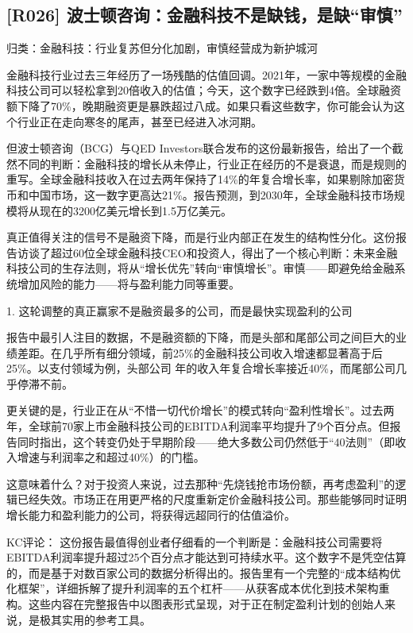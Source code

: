 \documentclass[11pt]{ctexart}
\begin{document}
\subsection{[R026] 波士顿咨询：金融科技不是缺钱，是缺“审慎”}
{\small\color{refgray}归类：金融科技：行业复苏但分化加剧，审慎经营成为新护城河}

金融科技行业过去三年经历了一场残酷的估值回调。2021年，一家中等规模的金融科技公司可以轻松拿到20倍收入的估值；今天，这个数字已经跌到4倍。全球融资额下降了70\%，晚期融资更是暴跌超过八成。如果只看这些数字，你可能会认为这个行业正在走向寒冬的尾声，甚至已经进入冰河期。

但波士顿咨询（BCG）与QED Investors联合发布的这份最新报告，给出了一个截然不同的判断：金融科技的增长从未停止，行业正在经历的不是衰退，而是规则的重写。全球金融科技收入在过去两年保持了14\%的年复合增长率，如果剔除加密货币和中国市场，这一数字更高达21\%。报告预测，到2030年，全球金融科技市场规模将从现在的3200亿美元增长到1.5万亿美元。

真正值得关注的信号不是融资下降，而是行业内部正在发生的结构性分化。这份报告访谈了超过60位全球金融科技CEO和投资人，得出了一个核心判断：未来金融科技公司的生存法则，将从“增长优先”转向“审慎增长”。审慎——即避免给金融系统增加风险的能力——将与盈利能力同等重要。

1. 这轮调整的真正赢家不是融资最多的公司，而是最快实现盈利的公司

报告中最引人注目的数据，不是融资额的下降，而是头部和尾部公司之间巨大的业绩差距。在几乎所有细分领域，前25\%的金融科技公司收入增速都显著高于后25\%。以支付领域为例，头部公司 年的收入年复合增长率接近40\%，而尾部公司几乎停滞不前。

更关键的是，行业正在从“不惜一切代价增长”的模式转向“盈利性增长”。过去两年，全球前70家上市金融科技公司的EBITDA利润率平均提升了9个百分点。但报告同时指出，这个转变仍处于早期阶段——绝大多数公司仍然低于“40法则”（即收入增速与利润率之和超过40\%）的门槛。

这意味着什么？对于投资人来说，过去那种“先烧钱抢市场份额，再考虑盈利”的逻辑已经失效。市场正在用更严格的尺度重新定价金融科技公司。那些能够同时证明增长能力和盈利能力的公司，将获得远超同行的估值溢价。

KC评论： 这份报告最值得创业者仔细看的一个判断是：金融科技公司需要将EBITDA利润率提升超过25个百分点才能达到可持续水平。这个数字不是凭空估算的，而是基于对数百家公司的数据分析得出的。报告里有一个完整的“成本结构优化框架”，详细拆解了提升利润率的五个杠杆——从获客成本优化到技术架构重构。这些内容在完整报告中以图表形式呈现，对于正在制定盈利计划的创始人来说，是极其实用的参考工具。
\end{document}
